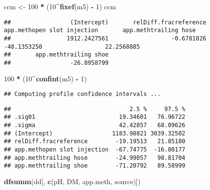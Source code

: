\documentclass[
]{article}
\newenvironment{Shaded}{\begin{snugshade}}{\end{snugshade}}
\newcommand{\DecValTok}[1]{\textcolor[rgb]{0.00,0.00,0.81}{#1}}
\newcommand{\FunctionTok}[1]{\textcolor[rgb]{0.13,0.29,0.53}{\textbf{#1}}}
\newcommand{\NormalTok}[1]{#1}
\newcommand{\OtherTok}[1]{\textcolor[rgb]{0.56,0.35,0.01}{#1}}
\newcommand{\SpecialCharTok}[1]{\textcolor[rgb]{0.81,0.36,0.00}{\textbf{#1}}}
\newcommand{\StringTok}[1]{\textcolor[rgb]{0.31,0.60,0.02}{#1}}
\begin{document}
\begin{Shaded}
\begin{Highlighting}[]
\NormalTok{ccm }\OtherTok{\textless{}{-}} \DecValTok{100} \SpecialCharTok{*}\NormalTok{ (}\DecValTok{10}\SpecialCharTok{\^{}}\FunctionTok{fixef}\NormalTok{(m5) }\SpecialCharTok{{-}} \DecValTok{1}\NormalTok{)}
\NormalTok{ccm}
\end{Highlighting}
\end{Shaded}

\begin{verbatim}
##                 (Intercept)       relDiff.fracreference app.methopen slot injection       app.methtrailing hose 
##                1912.2427561                  -0.6781026                 -48.1353250                  22.2568885 
##       app.methtrailing shoe 
##                 -26.8958799
\end{verbatim}

\begin{Shaded}
\begin{Highlighting}[]
\DecValTok{100} \SpecialCharTok{*}\NormalTok{ (}\DecValTok{10}\SpecialCharTok{\^{}}\FunctionTok{confint}\NormalTok{(m5) }\SpecialCharTok{{-}} \DecValTok{1}\NormalTok{)}
\end{Highlighting}
\end{Shaded}

\begin{verbatim}
## Computing profile confidence intervals ...
\end{verbatim}

\begin{verbatim}
##                                  2.5 %     97.5 %
## .sig01                        19.34601   76.96722
## .sigma                        42.42857   68.09626
## (Intercept)                 1183.98821 3039.32502
## relDiff.fracreference        -19.19513   21.85180
## app.methopen slot injection  -67.74775  -16.80177
## app.methtrailing hose        -24.99057   98.81704
## app.methtrailing shoe        -71.20792   89.58999
\end{verbatim}

\begin{Shaded}
\begin{Highlighting}[]
\FunctionTok{dfsumm}\NormalTok{(dd[, }\FunctionTok{c}\NormalTok{(}\StringTok{\textquotesingle{}pH\textquotesingle{}}\NormalTok{, }\StringTok{\textquotesingle{}DM\textquotesingle{}}\NormalTok{, }\StringTok{\textquotesingle{}app.meth\textquotesingle{}}\NormalTok{, }\StringTok{\textquotesingle{}source\textquotesingle{}}\NormalTok{)])}
\end{Highlighting}
\end{Shaded}
\end{document}
